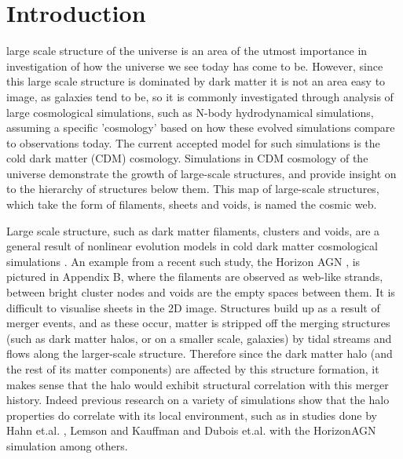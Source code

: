\documentclass[journal]{IEEEtran}
\begin{document}
\section{Introduction}
 large scale structure of the universe is an area of the utmost importance in investigation of how the universe we see today has come to be. However, since this large scale structure is dominated by dark matter \cite{lemson99} it is not an area easy to image, as galaxies tend to be, so it is commonly investigated through analysis of large cosmological simulations, such as N-body hydrodynamical simulations, assuming a specific 'cosmology' based on how these evolved simulations compare to observations today. The current accepted model for such simulations is the cold dark matter (CDM) cosmology. Simulations in CDM cosmology of the universe demonstrate the growth of large-scale structures, and provide insight on to the hierarchy of structures below them. This map of large-scale structures, which take the form of filaments, sheets and voids, is named the cosmic web.

Large scale structure, such as dark matter filaments, clusters and voids, are a general result of nonlinear evolution models in cold dark matter cosmological simulations \cite{davis85}. An example from a recent such study, the Horizon AGN \cite{dubois14}, is pictured in Appendix B, where the filaments are observed as web-like strands, between bright cluster nodes and voids are the empty spaces between them. It is difficult to visualise sheets in the 2D image. Structures build up as a result of merger events, and as these occur, matter is stripped off the merging structures (such as dark matter halos, or on a smaller scale, galaxies) by tidal streams and flows along the larger-scale structure. Therefore since the dark matter halo (and the rest of its matter components) are affected by this structure formation, it makes sense that the halo would exhibit structural correlation with this merger history. Indeed previous research on a variety of simulations show that the halo properties do correlate with its local environment, such as in studies done by Hahn et.al. \cite{hahn07a} \cite{hahn07b}, Lemson and Kauffman \cite{lemson99}and Dubois et.al. with the HorizonAGN simulation \cite{dubois14} among others. 
\end{document}
